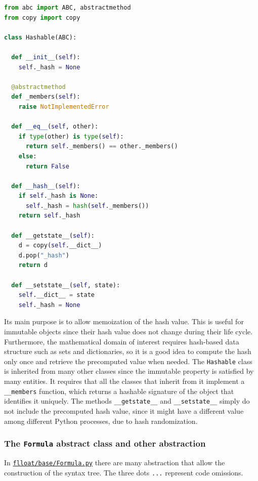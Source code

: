 \begin{lstlisting}[language=Python, style=Python, escapechar = £, label={code:Hashable}, caption={The \texttt{Hashable} class.}]
from abc import ABC, abstractmethod
from copy import copy

class Hashable(ABC):

  def __init__(self):
    self._hash = None

  @abstractmethod
  def _members(self):
    raise NotImplementedError

  def __eq__(self, other):
    if type(other) is type(self):
      return self._members() == other._members()
    else:
      return False

  def __hash__(self):
    if self._hash is None:
      self._hash = hash(self._members())
    return self._hash

  def __getstate__(self):
    d = copy(self.__dict__)
    d.pop("_hash")
    return d

  def __setstate__(self, state):
    self.__dict__ = state
    self._hash = None
\end{lstlisting}

Its main purpose is to allow memoization of the hash value. This is useful for immutable objects since their hash value does not change during their life cycle. Furthermore, the mathematical domain of interest requires hash-based data structure such as sets and dictionaries, so it is a good idea to compute the hash only once and retrieve the precomputed value when needed. The \texttt{Hashable} class is inherited from many other classes since the immutable property is satisfied by many entities. It requires that all the classes that inherit from it implement a \texttt{\_\_members} function, which returns a hashable signature of the object that identifies it uniquely. The methods \texttt{\_\_getstate\_\_} and \texttt{\_\_setstate\_\_} simply do not include the precomputed hash value, since it might have a different value among different Python processes, due to hash randomization.


\subsubsection{The \texttt{Formula} abstract class and other abstraction}
In \href{https://github.com/MarcoFavorito/flloat/blob/0.1.4/flloat/base/Formula.py}{\texttt{flloat/base/Formula.py}} there are many abstraction that allow the construction of the syntax tree. The three dots \texttt{...} represent code omissions. 

